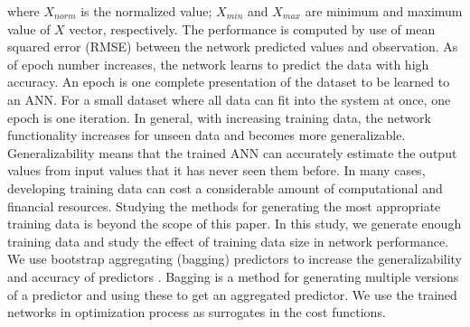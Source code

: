 where $X_{norm}$ is the normalized value; $X_{min}$ and $X_{max}$ are minimum and maximum value of $X$ vector, respectively. The performance is computed by use of mean squared error (RMSE) between the network predicted values and observation. As of epoch number increases, the network learns to predict the data with high accuracy. An epoch is one complete presentation of the dataset to be learned to an ANN. For a small dataset where all data can fit into the system at once, one epoch is one iteration. In general, with increasing training data, the network functionality increases for unseen data and becomes more generalizable. Generalizability means that the trained ANN can accurately estimate the output values from input values that it has never seen them before. In many cases, developing training data can cost a considerable amount of computational and financial resources. Studying the methods for generating the most appropriate training data is beyond the scope of this paper. In this study, we generate enough training data and study the effect of training data size in network performance. We use bootstrap aggregating (bagging) predictors to increase the generalizability and accuracy of predictors \citep{Breiman_1996_ML}. Bagging is a method for generating multiple versions of a predictor and using these to get an aggregated predictor. We use the trained networks in optimization process as surrogates in the cost functions. 


